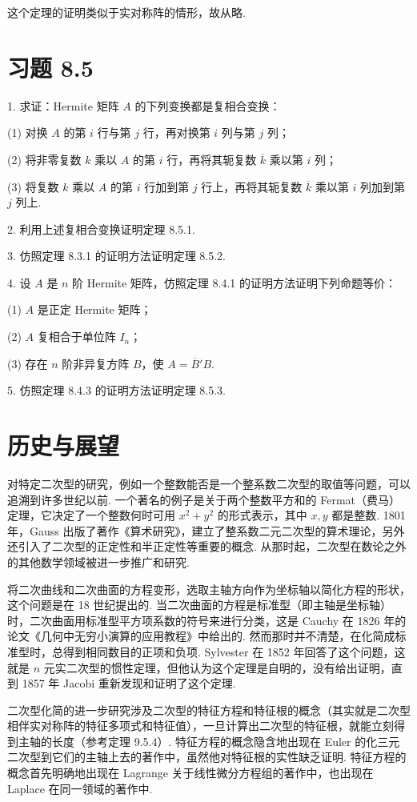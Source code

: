 \documentclass[UTF8, 12pt, fontset=fandol, oneside]{ctexart}
\begin{document}
这个定理的证明类似于实对称阵的情形，故从略.

\section*{习题 8.5}

1. 求证：Hermite 矩阵 $A$ 的下列变换都是复相合变换：

(1) 对换 $A$ 的第 $i$ 行与第 $j$ 行，再对换第 $i$ 列与第 $j$ 列；

(2) 将非零复数 $k$ 乘以 $A$ 的第 $i$ 行，再将其轭复数 $\overline{k}$ 乘以第 $i$ 列；

(3) 将复数 $k$ 乘以 $A$ 的第 $i$ 行加到第 $j$ 行上，再将其轭复数 $\overline{k}$ 乘以第 $i$ 列加到第 $j$ 列上.

2. 利用上述复相合变换证明定理 8.5.1.

3. 仿照定理 8.3.1 的证明方法证明定理 8.5.2.

4. 设 $A$ 是 $n$ 阶 Hermite 矩阵，仿照定理 8.4.1 的证明方法证明下列命题等价：

(1) $A$ 是正定 Hermite 矩阵；

(2) $A$ 复相合于单位阵 $I_n$；

(3) 存在 $n$ 阶非异复方阵 $B$，使 $A=\overline{B}'B$.

5. 仿照定理 8.4.3 的证明方法证明定理 8.5.3.

\section*{历史与展望}

对特定二次型的研究，例如一个整数能否是一个整系数二次型的取值等问题，可以追溯到许多世纪以前. 一个著名的例子是关于两个整数平方和的 Fermat（费马）定理，它决定了一个整数何时可用 $x^2+y^2$ 的形式表示，其中 $x,y$ 都是整数. 1801 年，Gauss 出版了著作《算术研究》，建立了整系数二元二次型的算术理论，另外还引入了二次型的正定性和半正定性等重要的概念. 从那时起，二次型在数论之外的其他数学领域被进一步推广和研究.

将二次曲线和二次曲面的方程变形，选取主轴方向作为坐标轴以简化方程的形状，这个问题是在 18 世纪提出的. 当二次曲面的方程是标准型（即主轴是坐标轴）时，二次曲面用标准型平方项系数的符号来进行分类，这是 Cauchy 在 1826 年的论文《几何中无穷小演算的应用教程》中给出的. 然而那时并不清楚，在化简成标准型时，总得到相同数目的正项和负项. Sylvester 在 1852 年回答了这个问题，这就是 $n$ 元实二次型的惯性定理，但他认为这个定理是自明的，没有给出证明，直到 1857 年 Jacobi 重新发现和证明了这个定理.

二次型化简的进一步研究涉及二次型的特征方程和特征根的概念（其实就是二次型相伴实对称阵的特征多项式和特征值），一旦计算出二次型的特征根，就能立刻得到主轴的长度（参考定理 9.5.4）. 特征方程的概念隐含地出现在 Euler 的化三元二次型到它们的主轴上去的著作中，虽然他对特征根的实性缺乏证明. 特征方程的概念首先明确地出现在 Lagrange 关于线性微分方程组的著作中，也出现在 Laplace 在同一领域的著作中.
\end{document}
